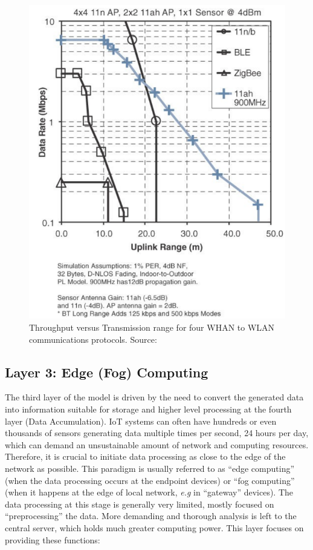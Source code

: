 \begin{figure}[H]
    \centering
    \includegraphics[width=0.55\linewidth]{images/communication-protocols-throughput.png}
    \caption{Throughput versus Transmission range for four WHAN to WLAN communications protocols. Source: \cite{10.5555/3161403}}
    \label{fig:communication-protocols-throughput}
\end{figure}



\subsection{Layer 3: Edge (Fog) Computing}
\label{sec:iot-model-layer3}

The third layer of the model is driven by the need to convert the generated data into information suitable for storage and higher level processing at the fourth layer (Data Accumulation). \acs{IoT} systems can often have hundreds or even thousands of sensors generating data multiple times per second, 24 hours per day, which can demand an unsustainable amount of network and computing resources. Therefore, it is crucial to initiate data processing as close to the edge of the network as possible.  This paradigm is usually referred to as ``edge computing'' (when the data processing occurs at the endpoint devices) or ``fog computing'' (when it happens at the edge of local network, \textit{e.g} in ``gateway'' devices). The data processing at this stage is generally very limited, mostly focused on ``preprocessing'' the data. More demanding and thorough analysis is left to the central server, which holds much greater computing power. This layer focuses on providing these functions:


